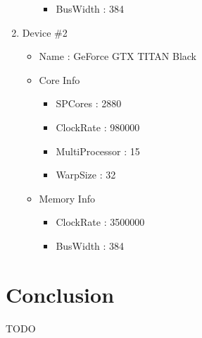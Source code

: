 \documentclass{article}
\begin{document}
\begin{enumerate}
\begin{itemize}
\begin{itemize}
            \item BusWidth : 384
        \end{itemize}
    \end{itemize}
    \item Device \#2
    \begin{itemize}
       \item Name : GeForce GTX TITAN Black
        \item Core Info
        \begin{itemize}
            \item SPCores : 2880
            \item ClockRate : 980000
            \item MultiProcessor : 15
            \item WarpSize : 32
        \end{itemize}
        \item Memory Info
        \begin{itemize}
            \item ClockRate : 3500000
            \item BusWidth : 384
        \end{itemize}
    \end{itemize}
\end{enumerate}
\section{Conclusion}
TODO


\end{document}

